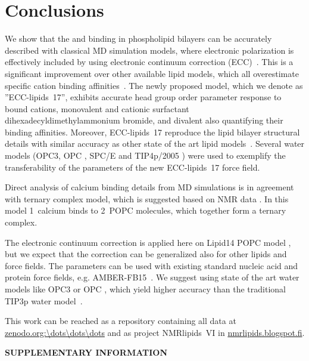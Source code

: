 \documentclass[aip,jcp,twocolumn]{revtex4}
\begin{document}
\section{Conclusions}
We show that the  and  binding in phospholipid bilayers can
be accurately described with classical MD simulation models, where electronic
polarization is effectively included by using electronic continuum correction (ECC)~\cite{leontyev11}.
This is a significant improvement over other available lipid models,
which all overestimate specific cation binding affinities~\cite{catte16}.  
The newly proposed model, which we denote as ''ECC-lipids~17'', 
exhibits accurate head group order parameter response to
bound cations, monovalent  and cationic surfactant dihexadecyldimethylammonium bromide, 
and divalent 
also quantifying their binding affinities.
Moreover, ECC-lipids~17 reproduce the lipid bilayer structural details
with similar accuracy as other state of the art lipid models~\cite{catte16}.
Several water models 
(OPC3\cite{Izadi16}, OPC \cite{Izadi14}, SPC/E \cite{Berendsen1987} and TIP4p/2005 \cite{Abascal2005}) 
were used to exemplify the transferability of 
the parameters of the new ECC-lipids~17 force field. 

Direct analysis of calcium binding details from MD simulations is in agreement
with ternary complex model, which is suggested based on NMR data \cite{altenbach84}.
In this model 1~calcium binds to 2~POPC molecules, which together form a ternary
complex.

The electronic continuum correction is applied here on Lipid14 POPC model \cite{dickson14},
but we expect that the correction can be generalized also for other lipids
and force fields.
The parameters can be used with existing standard nucleic acid and protein force fields, e.g. AMBER-FB15~\cite{Wang2017}. 
We suggest using state of the art water models like OPC3\cite{Izadi16} or OPC \cite{Izadi14},
which yield higher accuracy than the traditional TIP3p water model~\cite{jorgensen83}.


This work can be reached as a repository containing all data at \url{zenodo.org:\dots\dots\dots} and as project \mbox{NMRlipids~VI} in \url{nmrlipids.blogspot.fi}.



\begin{acknowledgments}
\end{acknowledgments}
\newpage
\appendix
\begin{center}
{\bf SUPPLEMENTARY INFORMATION}
\end{center}





\listoftodos
\end{document}
